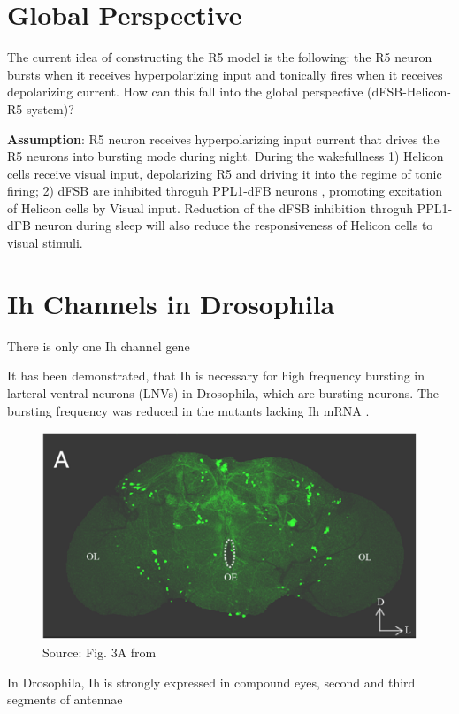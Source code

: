 \documentclass[11pt]{article}
\begin{document}
\section{Global Perspective}

The current idea of constructing the R5 model is the following: the R5 neuron bursts when it
receives hyperpolarizing input and tonically fires when it receives depolarizing current.
How can this fall into the global perspective (dFSB-Helicon-R5 system)?

\textbf{Assumption}: R5 neuron receives hyperpolarizing input current that drives the R5 neurons into
bursting mode during night. During the wakefullness 1) Helicon cells receive visual input, depolarizing
R5 and driving it into the regime of tonic firing; 2) dFSB are inhibited throguh PPL1-dFB neurons
\cite{liuTwoDopaminergicNeurons2012}, promoting excitation of Helicon cells by Visual input.
Reduction of the dFSB inhibition throguh PPL1-dFB neuron during sleep \cite{liuTwoDopaminergicNeurons2012}
will also reduce the responsiveness of Helicon cells to visual stimuli.


\section{Ih Channels in Drosophila}

There is only one Ih channel gene \cite{chenFunctionalStudyHyperpolarization2012,gisselmannVariantsDrosophilaMelanogaster2005}
    
It has been demonstrated, that Ih is necessary for high frequency bursting in
larteral ventral neurons (LNVs) in Drosophila, which are bursting neurons. The bursting
frequency was reduced in the mutants lacking Ih mRNA \cite{fernandez-chiappeHighFrequencyNeuronalBursting2021}.

\begin{figure}
    \vspace{-1\baselineskip}
    \includegraphics[width=\linewidth]{img/2025_01_15/Ih_expression_drosophila.png}
    \caption{Source: Fig. 3A from \cite{gonzalo-gomezIhCurrentNecessary2012}}
\end{figure}
In Drosophila, Ih is strongly expressed in compound eyes, second and third segments of antennae \cite{chenFunctionalStudyHyperpolarization2012}
\end{document}
